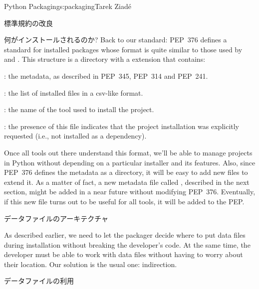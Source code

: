 \begin{aosachapter}{Python Packaging}{s:packaging}{Tarek Ziad\'{e}}
\begin{aosasect1}{標準規約の改良}
\begin{aosasect2}{何がインストールされるのか?}
Back to our standard: PEP~376 defines a standard for installed
packages whose format is quite similar to those used by
 and .  This structure is a directory with
a  extension that contains:

\begin{aosaitemize}

  \item {}: the metadata, as described in PEP~345, PEP~314
  and PEP~241.

  \item {}: the list of installed files in a csv-like format.

  \item {}: the name of the tool used to install the
  project.

  \item {}: the presence of this file indicates that the
  project installation was explicitly requested (i.e., not installed
  as a dependency).

\end{aosaitemize}

\noindent
Once all tools out there understand this format, we'll be able to
manage projects in Python without depending on a particular installer
and its features.  Also, since PEP~376 defines the metadata as a
directory, it will be easy to add new files to extend it.  As a matter
of fact, a new metadata file called , described in the
next section, might be added in a near future without modifying
PEP~376. Eventually, if this new file turns out to be useful for all
tools, it will be added to the PEP.

\end{aosasect2}

\begin{aosasect2}{データファイルのアーキテクチャ}

As described earlier, we need to let the packager decide where to put
data files during installation without breaking the developer's
code. At the same time, the developer must be able to work with data
files without having to worry about their location.  Our solution is
the usual one: indirection.

\begin{aosasect3}{データファイルの利用}


\end{aosasect3}
\end{aosasect2}
\end{aosasect1}
\end{aosachapter}
